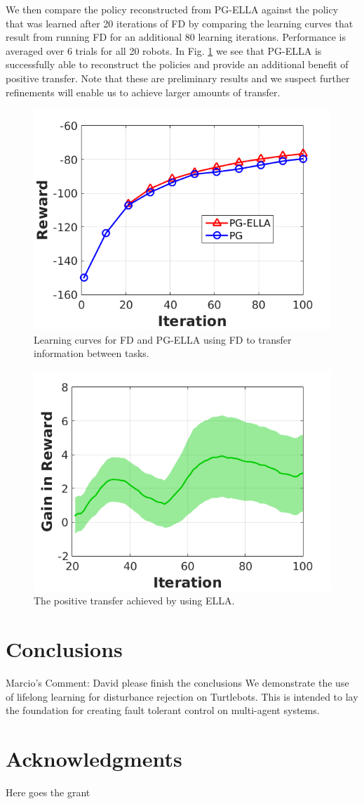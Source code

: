 \documentclass{aamas2016}
\begin{document}
We then compare the policy reconstructed from PG-ELLA against the policy that was learned after 20 iterations of FD by comparing the learning curves that result from running FD for an additional 80 learning iterations. Performance is averaged over 6 trials for all 20 robots. In Fig. \ref{fig:reward} we see that PG-ELLA is successfully able to reconstruct the policies and provide an additional benefit of positive transfer. Note that these are preliminary results and we suspect further refinements will enable us to achieve larger amounts of transfer.


\begin{figure}[!htbp]
    \centering
        \includegraphics[width=.42\textwidth]{images/2016_2_3_reward.png}
        \caption{Learning curves for FD and PG-ELLA using FD to transfer information between tasks. }\label{fig:reward}
\end{figure}

\begin{figure}[!htbp]
    \centering
        \includegraphics[width=.42\textwidth]{images/2016_2_3_gain.png}
        \caption{The positive transfer achieved by using ELLA. }\label{fig:gain}
\end{figure}

\section{Conclusions}
{\color{red} Marcio's Comment: David please finish the conclusions}
We demonstrate the use of lifelong learning for disturbance rejection on Turtlebots. This is intended to lay the foundation for creating fault tolerant control on multi-agent systems.

\section*{Acknowledgments}
{\color{red} 
Here goes the grant
}



%
\end{document}
